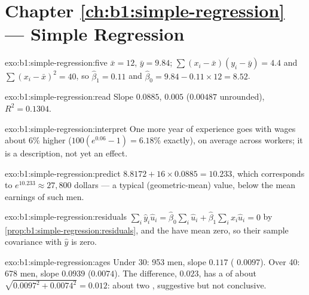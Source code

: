 \section*{Chapter \ref{ch:b1:simple-regression} --- Simple Regression}

\begin{solution}{exo:b1:simple-regression:five}
$\bar x = 12$, $\bar y = 9.84$; $\sum (x_i - \bar x)(y_i - \bar y) = 4.4$ and $\sum (x_i - \bar x)^2 = 40$, so $\hat\beta_1 = 0.11$ and
$\hat\beta_0 = 9.84 - 0.11 \times 12 = 8.52$.
\end{solution}

\begin{solution}{exo:b1:simple-regression:read}
Slope $0.0885$,  $0.005$ ($0.00487$ unrounded), $R^2 = 0.1304$.
\end{solution}

\begin{solution}{exo:b1:simple-regression:interpret}
One more year of experience goes with wages about $6\%$ higher ($100(e^{0.06} - 1) = 6.18\%$
exactly), on average across workers; it is a description, not yet an effect.
\end{solution}

\begin{solution}{exo:b1:simple-regression:predict}
$8.8172 + 16 \times 0.0885 = 10.233$, which corresponds to $e^{10.233} \approx 27{,}800$ dollars --- a
typical (geometric-mean) value, below the mean earnings of such men.
\end{solution}

\begin{solution}{exo:b1:simple-regression:residuals}
$\sum_i \hat y_i\hat u_i = \hat\beta_0\sum_i \hat u_i + \hat\beta_1\sum_i x_i\hat u_i = 0$ by \cref{prop:b1:simple-regression:residuals}, and the 
have mean zero, so their sample covariance with $\hat y$ is zero.
\end{solution}

\begin{solution}{exo:b1:simple-regression:ages}
Under 30: 953 men, slope $0.117$ ( $0.0097$). Over 40: 678 men, slope
$0.0939$ ($0.0074$). The difference, $0.023$, has a  of about
$\sqrt{0.0097^2 + 0.0074^2} = 0.012$: about two , suggestive but not
conclusive.
\end{solution}

